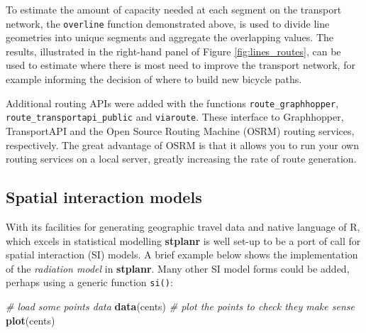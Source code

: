 \documentclass[11pt]{article}
\newenvironment{Shaded}{\begin{snugshade}}{\end{snugshade}}
\newcommand{\KeywordTok}[1]{\textcolor[rgb]{0.13,0.29,0.53}{\textbf{{#1}}}}
\newcommand{\CommentTok}[1]{\textcolor[rgb]{0.56,0.35,0.01}{\textit{{#1}}}}
\newcommand{\NormalTok}[1]{{#1}}
\begin{document}
To estimate the amount of capacity needed at each segment on the
transport network, the \texttt{overline} function demonstrated above, is
used to divide line geometries into unique segments and aggregate the
overlapping values. The results, illustrated in the right-hand panel of
Figure \ref{fig:lines_routes}, can be used to estimate where there is
most need to improve the transport network, for example informing the
decision of where to build new bicycle paths.

Additional routing APIs were added with the functions
\texttt{route\_graphhopper}, \texttt{route\_transportapi\_public} and
\texttt{viaroute}. These interface to Graphhopper, TransportAPI and the
Open Source Routing Machine (OSRM) routing services, respectively. The
great advantage of OSRM is that it allows you to run your own routing
services on a local server, greatly increasing the rate of route
generation.

\subsection{Spatial interaction
models}\label{spatial-interaction-models}

With its facilities for generating geographic travel data and native
language of R, which excels in statistical modelling \textbf{stplanr} is
well set-up to be a port of call for spatial interaction (SI) models. A
brief example below shows the implementation of the \emph{radiation
model} in \textbf{stplanr}. Many other SI model forms could be added,
perhaps using a generic function \texttt{si()}:

\begin{Shaded}
\begin{Highlighting}[]
\CommentTok{# load some points data}
\KeywordTok{data}\NormalTok{(cents)}
\CommentTok{# plot the points to check they make sense}
\KeywordTok{plot}\NormalTok{(cents)}
\end{Highlighting}
\end{Shaded}
\end{document}
